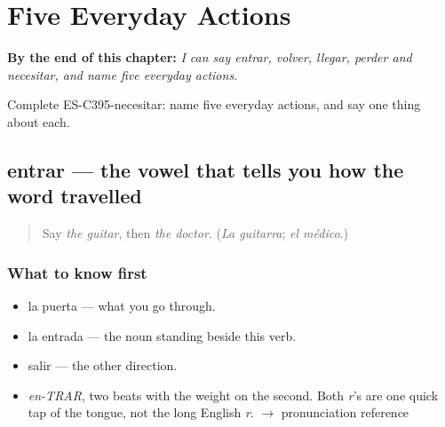 
\chapter{Five Everyday Actions}
\label{ch:entrar-y-volver}

\begin{chapteropening}
\textbf{By the end of this chapter:} \emph{I can say entrar, volver, llegar, perder and necesitar, and name five everyday actions.}

Complete ES-C395-necesitar: name five everyday actions, and say one thing about each.
\end{chapteropening}

\section[entrar]{entrar — the vowel that tells you how the word travelled}

\label{lesson:ES-C395-entrar}



\begin{quote}
Say \emph{the guitar}, then \emph{the doctor}. (\emph{La guitarra}; \emph{el médico}.)
\end{quote}

\subsection*{What to know first}
\begin{itemize}
\raggedright
  \item la puerta — what you go through.
  \item la entrada — the noun standing beside this verb.
  \item salir — the other direction.
\end{itemize}

\begin{sounds}
\begin{itemize}
\raggedright
  \item \emph{en-TRAR}, two beats with the weight on the second. Both \emph{r}'s are one quick tap of the tongue, not the long English \emph{r}. $\to$ pronunciation reference
\end{itemize}
\end{sounds}

